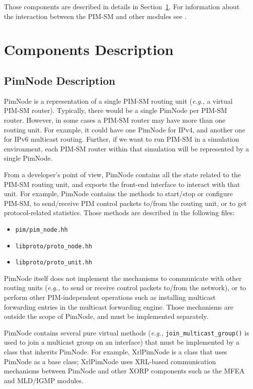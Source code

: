 \documentclass[11pt]{article}
\newcommand{\eg}{\emph{e.g.,}\xspace}
\begin{document}
Those components are described in details in
Section~\ref{sec:components_description}.
For information about the interaction between the PIM-SM and other modules
see \cite{xorp:multicast_arch}.


\section{Components Description}
\label{sec:components_description}


\subsection{PimNode Description}

PimNode is a representation of a single PIM-SM routing unit (\eg a
virtual PIM-SM router).
Typically, there would be a single PimNode per PIM-SM router.
However, in some cases a PIM-SM router may have more than one
routing unit. For example, it could have one PimNode for IPv4, and
another one for IPv6 multicast routing. Further, if we want to
run PIM-SM in a simulation environment, each PIM-SM router within that
simulation will be represented by a single PimNode.

From a developer's point of view, PimNode contains all the state related to
the PIM-SM routing unit, and exports the front-end interface to interact with
that unit.
For example, PimNode contains the methods to
start/stop or configure PIM-SM, to send/receive PIM control packets
to/from the routing unit, or to get protocol-related statistics.
Those methods are described in the following files:

\begin{itemize}
  \item \verb=pim/pim_node.hh=
  \item \verb=libproto/proto_node.hh=
  \item \verb=libproto/proto_unit.hh=
\end{itemize}

PimNode itself does not implement the mechanisms to communicate with
other routing units (\eg to send or receive control packets to/from the
network), or to perform other PIM-independent operations such as
installing multicast forwarding entries in the multicast forwarding
engine. Those mechanisms are outside the scope of PimNode, and must be
implemented separately.

PimNode contains several pure virtual methods (\eg
\verb=join_multicast_group()= is used to join a multicast group on
an interface) that must be implemented by a class that inherits PimNode.
For example, XrlPimNode is a class that uses PimNode as a base class;
XrlPimNode uses XRL-based communication mechanisms between PimNode
and other XORP components such as the MFEA and MLD/IGMP modules.
\end{document}
